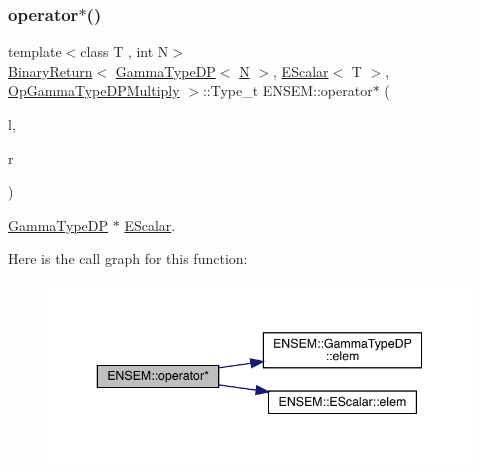 \subsubsection{\texorpdfstring{operator$\ast$()}{operator*()}\hspace{0.1cm}{\footnotesize\ttfamily [8/9]}}
{\footnotesize\ttfamily template$<$class T , int N$>$ \\
\mbox{\hyperlink{structENSEM_1_1BinaryReturn}{Binary\+Return}}$<$ \mbox{\hyperlink{classENSEM_1_1GammaTypeDP}{Gamma\+Type\+DP}}$<$ \mbox{\hyperlink{adat__devel_2lib_2hadron_2operator__name__util_8cc_a7722c8ecbb62d99aee7ce68b1752f337}{N}} $>$, \mbox{\hyperlink{classENSEM_1_1EScalar}{E\+Scalar}}$<$ T $>$, \mbox{\hyperlink{structENSEM_1_1OpGammaTypeDPMultiply}{Op\+Gamma\+Type\+D\+P\+Multiply}} $>$\+::Type\+\_\+t E\+N\+S\+E\+M\+::operator$\ast$ (\begin{DoxyParamCaption}\item[{const \mbox{\hyperlink{classENSEM_1_1GammaTypeDP}{Gamma\+Type\+DP}}$<$ \mbox{\hyperlink{adat__devel_2lib_2hadron_2operator__name__util_8cc_a7722c8ecbb62d99aee7ce68b1752f337}{N}} $>$ \&}]{l,  }\item[{const \mbox{\hyperlink{classENSEM_1_1EScalar}{E\+Scalar}}$<$ T $>$ \&}]{r }\end{DoxyParamCaption})\hspace{0.3cm}{\ttfamily [inline]}}



\mbox{\hyperlink{classENSEM_1_1GammaTypeDP}{Gamma\+Type\+DP}} $\ast$ \mbox{\hyperlink{classENSEM_1_1EScalar}{E\+Scalar}}. 

Here is the call graph for this function\+:
\nopagebreak
\begin{figure}[H]
\begin{center}
\leavevmode
\includegraphics[width=343pt]{d4/dca/group__escalar_ga54ffca46c333d9dad30043eb6cef6299_cgraph}
\end{center}
\end{figure}
\mbox{\label{group__escalar_ga546f1e55f2e4eda7a887fbf4fcaa177f}} 
